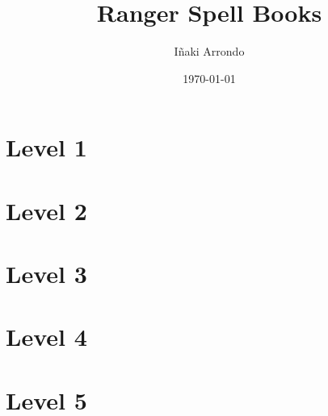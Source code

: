 \documentclass[a5paper,18pt]{book}
\title{Ranger Spell Books}
\author{Iñaki Arrondo}
\date{\today}
\begin{document}
\large

\maketitle

\tableofcontents

\chapter{Level 1}


















\chapter{Level 2}
















\chapter{Level 3}














\chapter{Level 4}







\chapter{Level 5}






\end{document}
